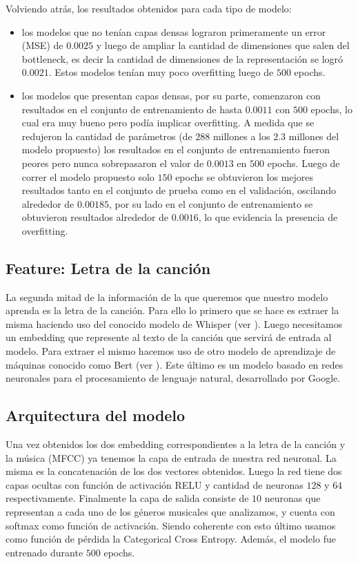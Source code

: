 \documentclass[colorinlistoftodos,twoside,twocolumn,10pt]{article} %
\begin{document}
Volviendo atrás, los resultados obtenidos para cada tipo de modelo:
\begin{itemize}
	\item los modelos que no tenían capas densas lograron primeramente un error (MSE) de $0.0025$ y luego de ampliar la   cantidad de dimensiones que salen del bottleneck, es decir la cantidad de dimensiones de la representación se logró $0.0021$. Estos modelos tenían muy poco overfitting luego de $500$ epochs.
	\item los modelos que presentan capas densas, por su parte, comenzaron con resultados en el conjunto de entrenamiento de hasta $0.0011$ con $500$ epochs, lo cual era muy bueno pero podía implicar overfitting. A medida que se redujeron la cantidad de parámetros (de $288$ millones a los $2.3$ millones del modelo propuesto) los resultados en el conjunto de entrenamiento fueron peores pero nunca sobrepasaron el valor de $0.0013$ en $500$ epochs. Luego de correr el modelo propuesto solo $150$ epochs se obtuvieron los mejores resultados tanto en el conjunto de prueba como en el validación, oscilando alrededor de $0.00185$, por su lado en el conjunto de entrenamiento se obtuvieron resultados alrededor de $0.0016$, lo que evidencia la presencia de overfitting.
\end{itemize}

\subsection{Feature: Letra de la canci\'on}

La segunda mitad de la informaci\'on de la que queremos que nuestro modelo aprenda es la letra de la canci\'on. Para ello lo primero que se hace es extraer la misma haciendo uso del conocido modelo de Whisper (ver \cite{whisper}). Luego necesitamos un embedding que represente al texto de la canci\'on que servir\'a de entrada al modelo. Para extraer el mismo hacemos uso de otro modelo de aprendizaje de m\'aquinas conocido como Bert (ver \cite{bert}). Este \'ultimo es un modelo basado en redes neuronales para el procesamiento de lenguaje natural, desarrollado por Google.

\subsection{Arquitectura del modelo}

Una vez obtenidos los dos embedding correspondientes a la letra de la canci\'on y la m\'usica (MFCC) ya tenemos la capa de entrada de nuestra red neuronal. La misma es la concatenaci\'on de los dos vectores obtenidos. Luego la red tiene  dos capas ocultas con funci\'on de activaci\'on RELU y cantidad de neuronas $128$ y $64$ respectivamente. Finalmente la capa de salida consiste de $10$ neuronas que representan a cada uno de los g\'eneros musicales que analizamos, y cuenta con softmax como funci\'on de activaci\'on. Siendo coherente con esto \'ultimo usamos como funci\'on de p\'erdida la Categorical Cross Entropy. Adem\'as, el modelo fue entrenado durante $500$ epochs.
\end{document}
